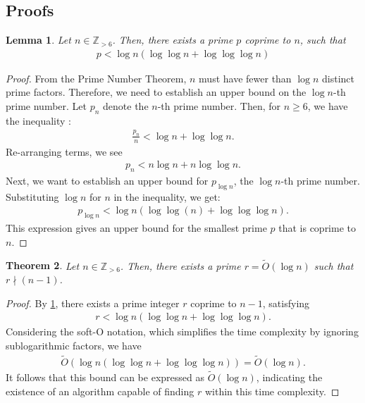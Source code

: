 \documentclass{article}
\theoremstyle{plain}
\newtheorem{theorem}{Theorem}
\newtheorem{lemma}[theorem]{Lemma}
\theoremstyle{definition}
\newcommand{\Z}{\mathbb{Z}}
\begin{document}
\subsection{Proofs}
\begin{lemma} \label{proof:leastcoprime}
Let $n \in \Z_{>6}$. Then, there exists a prime $p$ coprime to $n$, such that
\begin{align*}
    p < \log n \left( \log\log n + \log\log\log n \right)
\end{align*}
\end{lemma}
\begin{proof}
From the Prime Number Theorem, $n$ must have fewer than $\log n$ distinct prime factors. Therefore, we need to establish an upper bound on the $\log n$-th prime number. Let $p_n$ denote the $n$-th prime number. Then, for $n \geq 6$, we have the inequality \cite{rosser1941primebounds}:
\begin{align*}
    \frac{p_n}{n} < \log n + \log\log n .
\end{align*}
Re-arranging terms, we see
\begin{align*}
    p_n < n \log n + n \log\log n .
\end{align*}
Next, we want to establish an upper bound for $p_{\log n}$, the $\log n$-th prime number. Substituting $\log n$ for $n$ in the inequality, we get:
\begin{align*}
p_{\log n} < \log n \left( \log\log (n) + \log\log\log n \right) .
\end{align*}
This expression gives an upper bound for the smallest prime $p$ that is coprime to $n$.
\end{proof}
\begin{theorem} \label{proof:leastcoprimesofto}
Let $n \in \Z_{>6}$. Then, there exists a prime $r = \tilde{O}(\log n)$ such that $r \nmid (n-1)$.
\end{theorem}
\begin{proof}
By \cref{proof:leastcoprime}, there exists a prime integer $r$ coprime to $n-1$, satisfying
\begin{align*}
    r < \log n \left( \log\log n + \log\log\log n \right) .
\end{align*}
Considering the soft-O notation, which simplifies the time complexity by ignoring sublogarithmic factors, we have
\begin{align*}
    \tilde{O}(\log n \left( \log\log n + \log\log\log n \right)) = \tilde{O}(\log n).
\end{align*}
It follows that this bound can be expressed as $\tilde{O}(\log n)$, indicating the existence of an algorithm capable of finding $r$ within this time complexity.
\end{proof}
\end{document}
